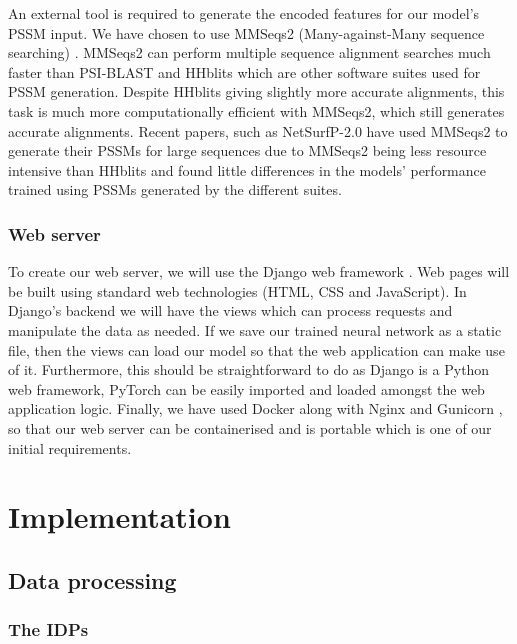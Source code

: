 \documentclass{l4proj}
\begin{document}
An external tool is required to generate the encoded features for our model's PSSM input. We have chosen to use MMSeqs2 (Many-against-Many sequence searching) \citep{Steinegger:17}. MMSeqs2 can perform multiple sequence alignment searches much faster than PSI-BLAST \citep{Altschul:97} and HHblits \citep{Remmert:12} which are other software suites used for PSSM generation. Despite HHblits giving slightly more accurate alignments, this task is much more computationally efficient with MMSeqs2, which still generates accurate alignments. Recent papers, such as NetSurfP-2.0 \citep{Klausen:19} have used MMSeqs2 to generate their PSSMs for large sequences due to MMSeqs2 being less resource intensive than HHblits and found little differences in the models' performance trained using PSSMs generated by the different suites.

\subsection{Web server}

To create our web server, we will use the Django web framework \citep{Django:05}. Web pages will be built using standard web technologies (HTML, CSS and JavaScript). In Django’s backend we will have the views which can process requests and manipulate the data as needed. If we save our trained neural network as a static file, then the views can load our model so that the web application can make use of it. Furthermore, this should be straightforward to do as Django is a Python web framework, PyTorch can be easily imported and loaded amongst the web application logic. 
Finally, we have used Docker \citep{Docker:14} along with Nginx \citep{Nginx:08} and Gunicorn \citep{gunicorn:wiki}, so that our web server can be containerised and is portable which is one of our initial requirements. 

\chapter{Implementation}

\section{Data processing}

\subsection{The IDPs}
\end{document}
